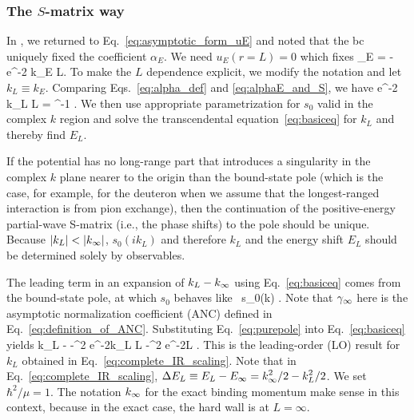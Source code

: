 	\medskip
	\subsubsection{The $S$-matrix way}

	In \cite{Furnstahl:2013vda}, we returned to Eq.~\eqref{eq:asymptotic_form_uE}
	and noted that the bc uniquely fixed the coefficient
	$\alpha_E$.  We need $u_E(r = L) = 0$ which fixes
	\beq
	\alpha_E = -e^{-2 k_E L}\;.
	\label{eq:alpha_def}
	\eeq
	To make the $L$ dependence explicit, we modify the notation and let
	$k_L \equiv k_E$.  Comparing Eqs.~\eqref{eq:alpha_def} and
	\eqref{eq:alphaE_and_S}, we have
	\beq
	e^{-2 k_L L} = \left[s_0(i k_L)\right]^{-1} \;.
	\label{eq:basiceq}
	\eeq
	We then use appropriate parametrization for $s_0$ valid in the complex $k$
	region and solve the transcendental
	equation~\eqref{eq:basiceq} for $k_L$ and thereby find $E_L$.

	If the potential has no long-range part that introduces a singularity
	in the complex $k$ plane nearer to the origin than the bound-state
	pole (which is the case, for example, for the deuteron when we assume that
	the longest-ranged interaction is from pion exchange), then the
	continuation of the positive-energy partial-wave S-matrix (i.e., the
	phase shifts) to the pole should be unique.  Because $|k_L| <
	|k_{\infty}|$, $s_0(i k_L)$ and therefore $k_L$ and the energy shift $E_L$
	should be determined solely by observables.

	The leading term in an expansion of $k_L - k_{\infty}$ using
	Eq.~\eqref{eq:basiceq} comes from the bound-state pole, at which $s_0$
	behaves like~\cite{newton2002scattering}
	\beq
	  s_0(k) \approx {}
	  \;.
	  \label{eq:purepole}
	\eeq
	Note that $\gamma_\infty$ here is
	the asymptotic normalization coefficient (ANC) defined in
	Eq.~\eqref{eq:definition_of_ANC}.
	Substituting Eq.~\eqref{eq:purepole} into Eq.~\eqref{eq:basiceq} yields
	\beq
	  k_L - \kinf \approx -\ANC^2 e^{-2k_L L} \approx -\ANC^2 e^{-2\kinf L}
	  \;.
	  \label{eq:kLatLO}
	\eeq
	This is the leading-order (LO) result for $k_L$ obtained in
	Eq.~\eqref{eq:complete_IR_scaling}.  Note that in
	Eq.~\eqref{eq:complete_IR_scaling}, $\displaystyle \Delta E_L \equiv
	E_L - E_{\infty} = k_{\infty}^2/2 - k_L^2/2$.  We set $\displaystyle \hbar^2/ \mu = 1$.
	The notation $k_{\infty}$ for the exact binding momentum make sense in this
	context, because in the exact case, the hard wall is at $L = \infty$.

